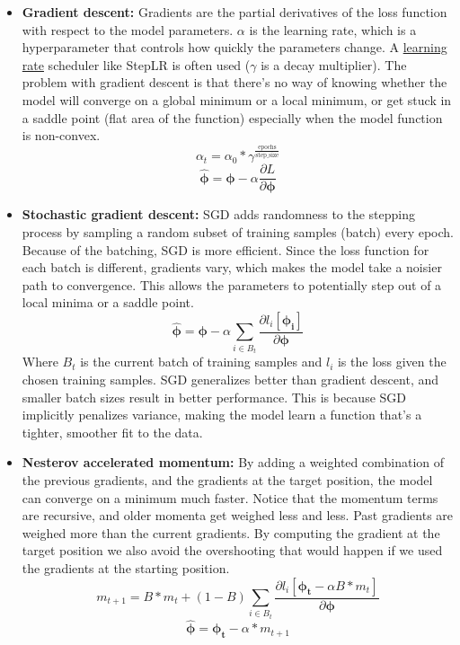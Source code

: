 \documentclass{article}
\begin{document}
\begin{itemize}
\item \textbf{Gradient descent:} Gradients are the partial derivatives of the loss function with respect to the model parameters. $\alpha$ is the learning rate, which is a hyperparameter that controls how quickly the parameters change. A \href{https://machinelearningmastery.com/a-gentle-introduction-to-learning-rate-schedulers/}{learning rate} scheduler like StepLR is often used ($\gamma$ is a decay multiplier). The problem with gradient descent is that there's no way of knowing whether the model will converge on a global minimum or a local minimum, or get stuck in a saddle point (flat area of the function) especially when the model function is non-convex.
\[ \alpha_t = \alpha_0 * \gamma^{\frac{\text{epochs}}{\text{step\_size}}} \]
\[ \boldsymbol{\hat{\phi}} = \boldsymbol{\phi} - \alpha\frac{\partial L}{\partial \boldsymbol{\phi}} \]

\item \textbf{Stochastic gradient descent:} SGD adds randomness to the stepping process by sampling a random subset of training samples (batch) every epoch. Because of the batching, SGD is more efficient. Since the loss function for each batch is different, gradients vary, which makes the model take a noisier path to convergence. This allows the parameters to potentially step out of a local minima or a saddle point.
\[ \hat{\boldsymbol{\phi}} = \boldsymbol{\phi} - \alpha \sum_{i \in B_t} \frac{\partial l_i[\boldsymbol{\phi_i}]}{\partial \boldsymbol{\phi}} \]
Where $B_t$ is the current batch of training samples and $l_i$ is the loss given the chosen training samples. SGD generalizes better than gradient descent, and smaller batch sizes result in better performance. This is because SGD implicitly penalizes variance, making the model learn a function that's a tighter, smoother fit to the data.

\item \textbf{Nesterov accelerated momentum:} By adding a weighted combination of the previous gradients, and the gradients at the target position, the model can converge on a minimum much faster. Notice that the momentum terms are recursive, and older momenta get weighed less and less. Past gradients are weighed more than the current gradients. By computing the gradient at the target position we also avoid the overshooting that would happen if we used the gradients at the starting position.
\[ m_{t + 1} = B * m_t + (1 - B)\sum_{i \in B_t} \frac{\partial l_i[\boldsymbol{\phi_t} - \alpha B * m_t]}{\partial \boldsymbol{\phi}} \]
\[ \boldsymbol{\hat{\phi}} = \boldsymbol{\phi_t} - \alpha * m_{t + 1} \]


\end{itemize}
\end{document}
